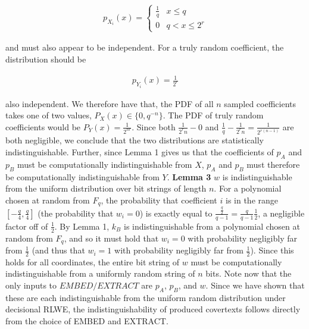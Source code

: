 \documentclass{article}
\begin{document}
\begin{align*}
p_{X_i}(x) = \begin{cases}
\frac{1}{q} & x \leq q \\
0 & q < x \leq 2^r
\end{cases}
\end{align*}

\noindent and must also appear to be independent.  For a truly random coefficient, the distribution 
should be 

\begin{align*}
p_{Y_i}(x) = \frac{1}{2^r}
\end{align*}

\noindent also independent.  We therefore have that, the PDF of all $n$ sampled coefficients 
takes one of two values, $P_{X}(x) \in \{0, q^{-n}\}$.  The PDF of truly random coefficients 
would be $P_{Y}(x) = \frac{1}{2^{nr}}$.  Since both $\frac{1}{2^rn} - 0$ and 
$\frac{1}{q} - \frac{1}{2^rn} = \frac{1}{2^{r(n-1)}}$ are both negligible, we conclude that 
the two distributions are statistically indistinguishable.  Further, since Lemma 1 gives us 
that the coefficients of $p_A$ and $p_B$ must be computationally indistinguishable from 
$X$, $p_A$ and $p_B$ must therefore be computationally indistinguishable from $Y$.
\newline\newline
\noindent \textbf{Lemma 3 } $w$ is indistinguishable from the uniform distribution over 
bit strings of length $n$.
\newline\newline
For a polynomial chosen at random from $F_q$, the probability that coefficient $i$ 
is in the range $[-\frac{q}{4}, \frac{q}{4}]$ (the probability that $w_i = 0$) is exactly equal to 
$\frac{\frac{q}{2}}{q-1} = \frac{q}{q-1} \frac{1}{2}$, a negligible factor off of 
$\frac{1}{2}$.  
	By Lemma 1, $k_B$ is indistinguishable from a polynomial chosen at 
random from $F_q$, and so it must hold that $w_i = 0$ with probability negligibly far from 
$\frac{1}{2}$ (and thus that $w_i=1$ with probability negligibly far from $\frac{1}{2}$).  Since 
this holds for all coordinates, the entire bit string of $w$ must be computationally indistinguishable 
from a uniformly random string of $n$ bits.
\newline\newline
Note now that the only inputs to $EMBED/EXTRACT$ are $p_A$, $p_B$, and $w$.  Since we have 
shown that these are each indistinguishable from the uniform random distribution under 
decisional RLWE, the indistinguishability of produced covertexts follows directly
from the choice of EMBED and EXTRACT.
\end{document}
